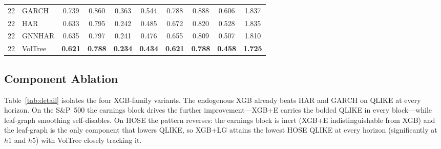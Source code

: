 \documentclass[runningheads,a4paper]{llncs}
\begin{document}
\begin{table}[!t]
\begin{tabular}{ll cccc cccc}
\midrule
22 & GARCH    & 0.739 & 0.860 & 0.363 & 0.544 & 0.788 & 0.888 & 0.606 & 1.837 \\
22 & HAR      & 0.633 & 0.795 & 0.242 & 0.485 & 0.672 & 0.820 & 0.528 & 1.835 \\
22 & GNNHAR   & 0.635 & 0.797 & 0.241 & 0.476 & 0.655 & 0.809 & 0.507 & 1.810 \\
22 & VolTree & \textbf{0.621} & \textbf{0.788} & \textbf{0.234} & \textbf{0.434} & \textbf{0.621} & \textbf{0.788} & \textbf{0.458} & \textbf{1.725} \\
\bottomrule
\end{tabular}
\end{table}

\subsection{Component Ablation}
Table~\ref{tab:detail} isolates the four XGB-family variants. The endogenous XGB already beats HAR and
GARCH on QLIKE at every horizon. On the S\&P~500 the earnings block drives the further improvement---XGB+E
carries the bolded QLIKE in every block---while leaf-graph smoothing self-disables. On HOSE the pattern
reverses: the earnings block is inert (XGB+E indistinguishable from XGB) and the leaf-graph is the only
component that lowers QLIKE, so XGB+LG attains the lowest HOSE QLIKE at every horizon (significantly at $h1$
and $h5$) with VolTree closely tracking it.
\end{document}
